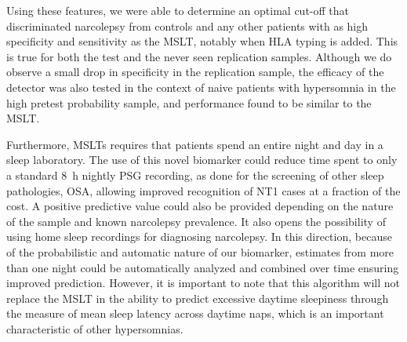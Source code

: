 Using these features, we were able to determine an optimal cut-off that discriminated narcolepsy from controls and any other patients with as high specificity and sensitivity as the \ac{MSLT}, notably when \ac{HLA} typing is added. 
This is true for both the test and the never seen replication samples. 
Although we do observe a small drop in specificity in the replication sample, the efficacy of the detector was also tested in the context of naive patients with hypersomnia in the high pretest probability sample, and performance found to be similar to the \ac{MSLT}.

Furthermore, \acp{MSLT} requires that patients spend an entire night and day in a sleep laboratory. 
The use of this novel biomarker could reduce time spent to only a standard \SI{8}{\hour} nightly \ac{PSG} recording, as done for the screening of other sleep pathologies, \eg \ac{OSA}, allowing improved recognition of \ac{NT1} cases at a fraction of the cost. 
A positive predictive value could also be provided depending on the nature of the sample and known narcolepsy prevalence.
It also opens the possibility of using home sleep recordings for diagnosing narcolepsy. 
In this direction, because of the probabilistic and automatic nature of our biomarker, estimates from more than one night could be automatically analyzed and combined over time ensuring improved prediction. 
However, it is important to note that this algorithm will not replace the \ac{MSLT} in the ability to predict excessive daytime sleepiness through the measure of mean sleep latency across daytime naps, which is an important characteristic of other hypersomnias.

